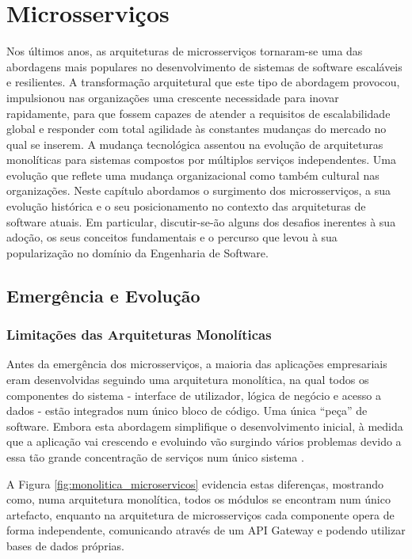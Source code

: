 \chapter{Microsserviços}

Nos últimos anos, as arquiteturas de microsserviços tornaram-se uma das abordagens mais populares no desenvolvimento de sistemas de software escaláveis e resilientes. A transformação arquitetural que este tipo de abordagem provocou, impulsionou nas organizações uma crescente necessidade para inovar rapidamente, para que fossem capazes de atender a requisitos de escalabilidade global e responder com total agilidade às constantes mudanças do mercado no qual se inserem. A mudança tecnológica assentou na evolução de arquiteturas monolíticas para sistemas compostos por múltiplos serviços independentes. Uma evolução que reflete uma mudança organizacional como também cultural nas organizações. Neste capítulo abordamos o surgimento dos microsserviços, a sua evolução histórica e o seu posicionamento no contexto das arquiteturas de software atuais. Em particular, discutir-se-ão alguns dos desafios inerentes à sua adoção, os seus conceitos fundamentais e o percurso que levou à sua popularização no domínio da Engenharia de Software.

\section{Emergência e Evolução}

\subsection{Limitações das Arquiteturas Monolíticas}

Antes da emergência dos microsserviços, a maioria das aplicações empresariais eram desenvolvidas seguindo uma arquitetura monolítica, na qual todos os componentes do sistema - interface de utilizador, lógica de negócio e acesso a dados - estão integrados num único bloco de código. Uma única “peça” de software. Embora esta abordagem simplifique o desenvolvimento inicial, à medida que a aplicação vai crescendo e evoluindo vão surgindo vários problemas devido a essa tão grande concentração de serviços num único sistema \cite{Villamizar2015}.

\clearpage

A Figura \ref{fig:monolitica_microservicos} evidencia estas diferenças, mostrando como, numa arquitetura monolítica, todos os módulos se encontram num único artefacto, enquanto na arquitetura de microsserviços cada componente opera de forma independente, comunicando através de um API Gateway e podendo utilizar bases de dados próprias.


